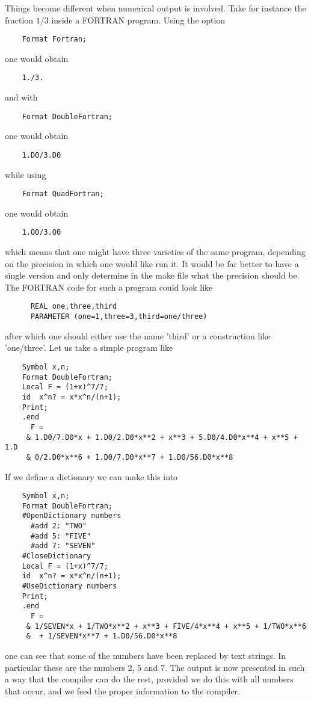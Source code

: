 Things become different when numerical output is 
involved. Take for instance the fraction $1/3$ inside a 
FORTRAN program. 
Using the option
\begin{verbatim}
    Format Fortran;
\end{verbatim}
one would obtain
\begin{verbatim}
    1./3.
\end{verbatim}
and with
\begin{verbatim}
    Format DoubleFortran;
\end{verbatim}
one would obtain
\begin{verbatim}
    1.D0/3.D0
\end{verbatim}
while using
\begin{verbatim}
    Format QuadFortran;
\end{verbatim}
one would obtain
\begin{verbatim}
    1.Q0/3.Q0
\end{verbatim}
which means that one might have three varieties of the same program, 
depending on the precision in which one would like run it. It would be far 
better to have a single version and only determine in the make file what 
the precision should be. The FORTRAN code for such a program could look 
like
\begin{verbatim}
      REAL one,three,third
      PARAMETER (one=1,three=3,third=one/three)
\end{verbatim}
after which one should either use the name 'third' or a construction like 
'one/three'. Let us take a simple program like
\begin{verbatim}
    Symbol x,n;
    Format DoubleFortran;
    Local F = (1+x)^7/7;
    id  x^n? = x*x^n/(n+1);
    Print;
    .end
      F =
     & 1.D0/7.D0*x + 1.D0/2.D0*x**2 + x**3 + 5.D0/4.D0*x**4 + x**5 + 1.D
     & 0/2.D0*x**6 + 1.D0/7.D0*x**7 + 1.D0/56.D0*x**8
\end{verbatim}
If we define a dictionary we can make this into
\begin{verbatim}
    Symbol x,n;
    Format DoubleFortran;
    #OpenDictionary numbers
      #add 2: "TWO"
      #add 5: "FIVE"
      #add 7: "SEVEN"
    #CloseDictionary
    Local F = (1+x)^7/7;
    id  x^n? = x*x^n/(n+1);
    #UseDictionary numbers
    Print;
    .end
      F =
     & 1/SEVEN*x + 1/TWO*x**2 + x**3 + FIVE/4*x**4 + x**5 + 1/TWO*x**6
     &  + 1/SEVEN*x**7 + 1.D0/56.D0*x**8
\end{verbatim}
one can see that some of the numbers have been replaced by text strings. In 
particular these are the numbers 2, 5 and 7. The output is now presented in 
such a way that the compiler can do the rest, provided we do this with all 
numbers that occur, and we feed the proper information to the compiler.

